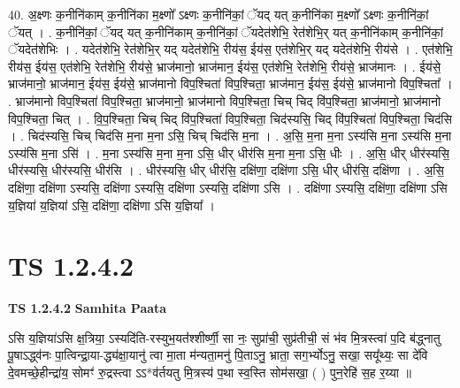 \documentclass[17pt]{extarticle}
\begin{document}
40. अ॒क्ष्णः क॒नीनि॑काम् क॒नीनि॑का म॒क्ष्णो᳚ ऽक्ष्णः क॒नीनि॑कां॒ ॅयद् यत् क॒नीनि॑का म॒क्ष्णो᳚ ऽक्ष्णः क॒नीनि॑कां॒ ॅयत् । . क॒नीनि॑कां॒ ॅयद् यत् क॒नीनि॑काम् क॒नीनि॑कां॒ ॅयदेत॑शेभि॒ रेत॑शेभि॒र् यत् क॒नीनि॑काम् क॒नीनि॑कां॒ ॅयदेत॑शेभिः । . यदेत॑शेभि॒ रेत॑शेभि॒र् यद् यदेत॑शेभि॒ रीय॑स॒ ईय॑स॒ एत॑शेभि॒र् यद् यदेत॑शेभि॒ रीय॑से । . एत॑शेभि॒ रीय॑स॒ ईय॑स॒ एत॑शेभि॒ रेत॑शेभि॒ रीय॑से॒ भ्राज॑मानो॒ भ्राज॑मान॒ ईय॑स॒ एत॑शेभि॒ रेत॑शेभि॒ रीय॑से॒ भ्राज॑मानः । . ईय॑से॒ भ्राज॑मानो॒ भ्राज॑मान॒ ईय॑स॒ ईय॑से॒ भ्राज॑मानो विप॒श्चिता॑ विप॒श्चिता॒ भ्राज॑मान॒ ईय॑स॒ ईय॑से॒ भ्राज॑मानो विप॒श्चिता᳚ । . भ्राज॑मानो विप॒श्चिता॑ विप॒श्चिता॒ भ्राज॑मानो॒ भ्राज॑मानो विप॒श्चिता॒ चिच् चिद् वि॑प॒श्चिता॒ भ्राज॑मानो॒ भ्राज॑मानो विप॒श्चिता॒ चित् । . वि॒प॒श्चिता॒ चिच् चिद् वि॑प॒श्चिता॑ विप॒श्चिता॒ चिद॑स्यसि॒ चिद् वि॑प॒श्चिता॑ विप॒श्चिता॒ चिद॑सि । . चिद॑स्यसि॒ चिच् चिद॑सि म॒ना म॒ना ऽसि॒ चिच् चिद॑सि म॒ना । . अ॒सि॒ म॒ना म॒ना ऽस्य॑सि म॒ना ऽस्य॑सि म॒ना ऽस्य॑सि म॒ना ऽसि॑ । . म॒ना ऽस्य॑सि म॒ना म॒ना ऽसि॒ धीर् धीर॑सि म॒ना म॒ना ऽसि॒ धीः । . अ॒सि॒ धीर् धीर॑स्यसि॒ धीर॑स्यसि॒ धीर॑स्यसि॒ धीर॑सि । . धीर॑स्यसि॒ धीर् धीर॑सि॒ दक्षि॑णा॒ दक्षि॑णा ऽसि॒ धीर् धीर॑सि॒ दक्षि॑णा । . अ॒सि॒ दक्षि॑णा॒ दक्षि॑णा ऽस्यसि॒ दक्षि॑णा ऽस्यसि॒ दक्षि॑णा ऽस्यसि॒ दक्षि॑णा ऽसि । . दक्षि॑णा ऽस्यसि॒ दक्षि॑णा॒ दक्षि॑णा ऽसि य॒ज्ञिया॑ य॒ज्ञिया॑ ऽसि॒ दक्षि॑णा॒ दक्षि॑णा ऽसि य॒ज्ञिया᳚ । \newline
\pagebreak
{}
\section*{ TS 1.2.4.2 }

\textbf{TS 1.2.4.2 } \newline
\textbf{Samhita Paata} \newline

ऽसि य॒ज्ञिया॑ऽसि क्ष॒त्रिया॒ ऽस्यदि॑ति-रस्युभ॒यत॑॑श्शीर्ष्णी॒ सा नः॒ सुप्रा॑ची॒ सुप्र॑तीची॒ सं भ॑व मि॒त्रस्त्वा॑ प॒दि ब॑द्ध्नातु पू॒षाऽद्ध्व॑नः पा॒त्विन्द्रा॒या-द्ध्य॑क्षा॒यानु॑ त्वा मा॒ता म॑न्यता॒मनु॑ पि॒ताऽनु॒ भ्राता॒ सग॒र्भ्योऽनु॒ सखा॒ सयू᳚थ्यः॒ सा दे॑वि दे॒वमच्छे॒हीन्द्रा॑य॒ सोमꣳ॑  रु॒द्रस्त्वा ऽऽ*व॑र्तयतु मि॒त्रस्य॑ प॒था स्व॒स्ति सोम॑सखा॒ ( ) पुन॒रेहि॑ स॒ह र॒य्या ॥ \newline
\end{document}
